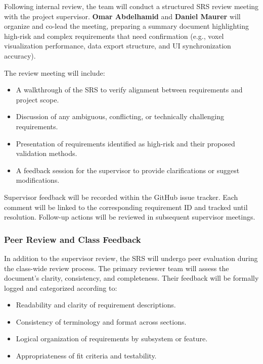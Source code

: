 \documentclass[12pt, titlepage]{article}
\begin{document}
Following internal review, the team will conduct a structured SRS review meeting with the project supervisor. \textbf{Omar Abdelhamid} and \textbf{Daniel Maurer} will organize and co-lead the meeting, preparing a summary document highlighting high-risk and complex requirements that need confirmation (e.g., voxel visualization performance, data export structure, and UI synchronization accuracy).

The review meeting will include:

\begin{itemize}
  \item A walkthrough of the SRS to verify alignment between requirements and project scope.
  \item Discussion of any ambiguous, conflicting, or technically challenging requirements.
  \item Presentation of requirements identified as high-risk and their proposed validation methods.
  \item A feedback session for the supervisor to provide clarifications or suggest modifications.
\end{itemize}

Supervisor feedback will be recorded within the GitHub issue tracker. Each comment will be linked to the corresponding requirement ID and tracked until resolution. Follow-up actions will be reviewed in subsequent supervisor meetings.

\subsubsection{Peer Review and Class Feedback}

In addition to the supervisor review, the SRS will undergo peer evaluation during the class-wide review process. The primary reviewer team will assess the document’s clarity, consistency, and completeness. Their feedback will be formally logged and categorized according to:

\begin{itemize}
  \item Readability and clarity of requirement descriptions.
  \item Consistency of terminology and format across sections.
  \item Logical organization of requirements by subsystem or feature.
  \item Appropriateness of fit criteria and testability.
\end{itemize}
\end{document}
